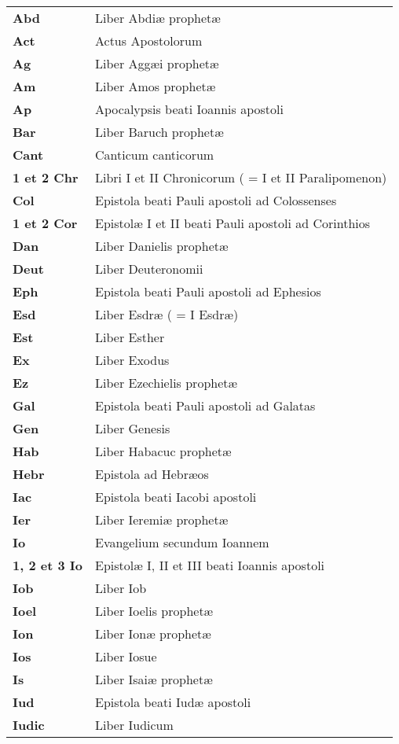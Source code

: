 \setlength{\tabcolsep}{0cm}
\renewcommand{\arraystretch}{0.8}
\begin{longtable}{>{\small\bf}p{1.5cm}<{} >{\small}p{7cm}<{}}
Abd & Liber Abdiæ prophetæ\\
Act & Actus Apostolorum\\
Ag & Liber Aggæi prophetæ\\
Am & Liber Amos prophetæ\\
Ap & Apocalypsis beati Ioannis apostoli\\
Bar & Liber Baruch prophetæ\\
Cant & Canticum canticorum\\
1 et 2 Chr & Libri I et II Chronicorum ( = I et II Paralipomenon)\\
Col & Epistola beati Pauli apostoli ad Colossenses\\
1 et 2 Cor & Epistolæ I et II beati Pauli apostoli ad Corinthios\\
Dan & Liber Danielis prophetæ\\
Deut & Liber Deuteronomii\\
Eph & Epistola beati Pauli apostoli ad Ephesios\\
Esd & Liber Esdræ ( = I Esdræ)\\
Est & Liber Esther\\
Ex & Liber Exodus\\
Ez & Liber Ezechielis prophetæ\\
Gal & Epistola beati Pauli apostoli ad Galatas\\
Gen & Liber Genesis\\
Hab & Liber Habacuc prophetæ\\
Hebr & Epistola ad Hebræos\\
Iac & Epistola beati Iacobi apostoli\\
Ier & Liber Ieremiæ prophetæ\\
Io & Evangelium secundum Ioannem\\
1, 2 et 3 Io & Epistolæ I, II et III beati Ioannis apostoli\\
Iob & Liber Iob\\
Ioel & Liber Ioelis prophetæ\\
Ion & Liber Ionæ prophetæ\\
Ios & Liber Iosue\\
Is & Liber Isaiæ prophetæ\\
Iud & Epistola beati Iudæ apostoli\\
Iudic & Liber Iudicum\\

\end{longtable}
